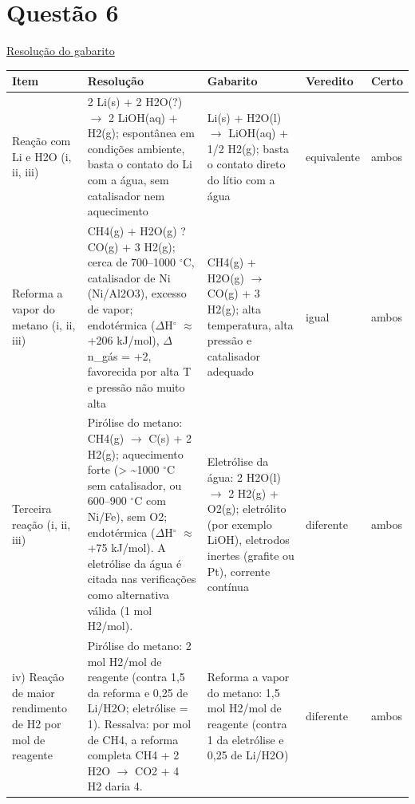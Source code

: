 \documentclass{article}%
\begin{document}
\section*{Questão 6}%
\href{https://poliedroresolve.sistemapoliedro.com.br/vestibulares/ita/2027/ita-2-fase-dia-2-21-10-2026-2-fase-dia-2/dissertativa-6-quimica-2-fase-dia-2-ita-2027}{Resolução do gabarito}\par\smallskip%
\begin{longtable}{@{}p{} p{} p{} p{} p{}@{}}\toprule Item & Resolução & Gabarito & Veredito & Certo \\ \midrule
Reação com Li e H2O (i, ii, iii) & 2 Li(s) + 2 H2O(?) $\to$ 2 LiOH(aq) + H2(g); espontânea em condições ambiente, basta o contato do Li com a água, sem catalisador nem aquecimento & Li(s) + H2O(l) $\to$ LiOH(aq) + 1/2 H2(g); basta o contato direto do lítio com a água & equivalente & ambos \\
Reforma a vapor do metano (i, ii, iii) & CH4(g) + H2O(g) ? CO(g) + 3 H2(g); cerca de 700--1000 $^\circ$C, catalisador de Ni (Ni/Al2O3), excesso de vapor; endotérmica ($\Delta$H$^\circ$ $\approx$ +206 kJ/mol), $\Delta$n\_gás = +2, favorecida por alta T e pressão não muito alta & CH4(g) + H2O(g) $\to$ CO(g) + 3 H2(g); alta temperatura, alta pressão e catalisador adequado & igual & ambos \\
Terceira reação (i, ii, iii) & Pirólise do metano: CH4(g) $\to$ C(s) + 2 H2(g); aquecimento forte (> \textasciitilde{}1000 $^\circ$C sem catalisador, ou 600--900 $^\circ$C com Ni/Fe), sem O2; endotérmica ($\Delta$H$^\circ$ $\approx$ +75 kJ/mol). A eletrólise da água é citada nas verificações como alternativa válida (1 mol H2/mol). & Eletrólise da água: 2 H2O(l) $\to$ 2 H2(g) + O2(g); eletrólito (por exemplo LiOH), eletrodos inertes (grafite ou Pt), corrente contínua & diferente & ambos \\
iv) Reação de maior rendimento de H2 por mol de reagente & Pirólise do metano: 2 mol H2/mol de reagente (contra 1,5 da reforma e 0,25 de Li/H2O; eletrólise = 1). Ressalva: por mol de CH4, a reforma completa CH4 + 2 H2O $\to$ CO2 + 4 H2 daria 4. & Reforma a vapor do metano: 1,5 mol H2/mol de reagente (contra 1 da eletrólise e 0,25 de Li/H2O) & diferente & ambos \\
\bottomrule\end{longtable}%
\end{document}
